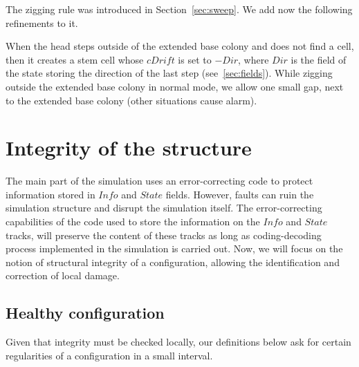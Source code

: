 \documentclass[12pt]{memoir}
\newcommand{\fld}[1]{\ensuremath{\textit{#1}}}
\newcommand{\Z}{Z}
\newcommand{\Dir}{\fld{Dir}}
\newcommand{\cDrift}{\fld{cDrift}}
\newcommand{\Info}{\fld{Info}}
\newcommand{\State}{\fld{State}}
\begin{document}
The zigging rule was introduced in Section~\ref{sec:sweep}.
We add now the following refinements to it.

When the head steps outside of the extended base colony and
does not find a cell, then it creates a stem cell whose
\( \cDrift \) is set to \( -\Dir \), where \( \Dir \) is the field
of the state storing the direction of the last step (see~\ref{sec:fields}).
While zigging outside the extended base colony in normal mode,
we allow one small gap, next to the extended base colony
(other situations cause alarm).




\section{Integrity of the structure}            \label{sec:integrity}
The main part of the simulation uses an error-correcting
code to protect information stored in \( \Info \) and \( \State \) fields.
However, faults can ruin the simulation structure
and disrupt the simulation itself.
The error-correcting capabilities of the code
used to store the information on the \( \Info \) and
\( \State \) tracks, will preserve the content
of these tracks as long as coding-decoding
process implemented in the simulation is carried out.
Now, we will focus on the notion of structural integrity of
a configuration, allowing the identification and correction of local damage.

\subsection{Healthy configuration}

Given that integrity must be checked locally,
our definitions below ask for certain regularities of a configuration
in a small interval.
\end{document}
